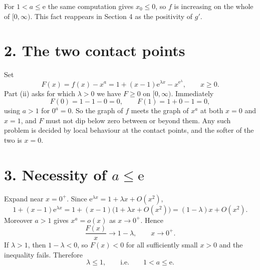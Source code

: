 \documentclass[12pt]{article}
\newcommand{\e}{\mathrm{e}}
\newcommand{\LL}{\lambda}
\begin{document}
For \(1<a\le\e\) the same computation gives \(x_0\le0\), so \(f\) is
increasing on the whole of \([0,\infty)\). This fact reappears in
Section 4 as the positivity of \(g'\).

\section*{2. The two contact points}

Set
\[
F(x)=f(x)-x^a=1+(x-1)\e^{\LL x}-x^{\e^{\LL}},\qquad x\ge0 .
\]
Part (ii) asks for which \(\LL>0\) we have \(F\ge0\) on \([0,\infty)\).
Immediately
\[
F(0)=1-1-0=0,
\qquad
F(1)=1+0-1=0,
\tag{3}
\]
using \(a>1\) for \(0^a=0\). So the graph of \(f\) meets the graph of
\(x^a\) at both \(x=0\) and \(x=1\), and \(F\) must not dip below zero
between or beyond them. Any such problem is decided by local behaviour at
the contact points, and the softer of the two is \(x=0\).

\begin{center}
\end{center}

\section*{3. Necessity of \(a\le\mathrm e\)}

Expand near \(x=0^+\). Since \(\e^{\LL x}=1+\LL x+O(x^2)\),
\[
1+(x-1)\e^{\LL x}
=1+(x-1)\bigl(1+\LL x+O(x^2)\bigr)
=(1-\LL)x+O(x^2).
\tag{4}
\]
Moreover \(a>1\) gives \(x^a=o(x)\) as \(x\to0^+\). Hence
\[
\frac{F(x)}{x}\longrightarrow 1-\LL,\qquad x\to0^+ .
\tag{5}
\]
If \(\LL>1\), then \(1-\LL<0\), so \(F(x)<0\) for all sufficiently small
\(x>0\) and the inequality fails. Therefore
\[
\boxed{\LL\le1,\qquad\text{i.e.}\qquad 1<a\le\e .}
\tag{6}
\]
\end{document}
